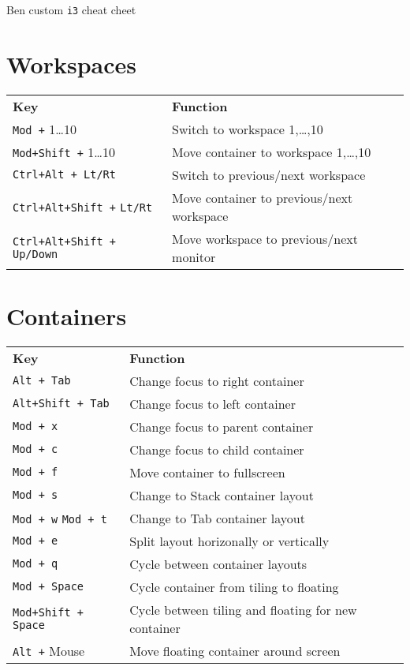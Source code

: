 \documentclass[landscape]{article}
\newcommand{\thead}[1]{{\color{black}\bf#1}}
\newcommand{\blankfirst}{%
  \ifodd\rownum\advance\rownum1\relax\fi}
\begin{document}
\thispagestyle{empty}
\begin{center}
  \Huge Ben custom \texttt{i3} cheat cheet %
\end{center}

\begin{multicols}{3}
  \small
  \section*{Workspaces}
  \blankfirst
  \noindent\begin{tabular}{p{0.9in}p{2in}} %
    \thead{Key} & \thead{Function}\\
    \verb|Mod +| 1\dots10 & Switch to workspace 1,\dots,10\\
    \verb|Mod+Shift +| 1\dots10 & Move container to workspace 1,\dots,10\\
    \verb|Ctrl+Alt + Lt/Rt| & Switch to previous/next workspace\\
    \verb|Ctrl+Alt+Shift +| \verb|Lt/Rt| & Move container to previous/next workspace\\
    \verb|Ctrl+Alt+Shift +| \verb|Up/Down| & Move workspace to previous/next monitor\\
  \end{tabular}

  \section*{Containers}
  \blankfirst
  \noindent\begin{tabular}{p{0.9in}p{2in}} %
    \thead{Key} & \thead{Function}\\
    \verb|Alt + Tab| & Change focus to right container\\
    \verb|Alt+Shift + Tab| & Change focus to left container\\
    \verb|Mod + x| & Change focus to parent container\\
    \verb|Mod + c| & Change focus to child container\\
    \verb|Mod + f| & Move container to fullscreen\\
    \verb|Mod + s| & Change to Stack container layout\\
    \verb|Mod + w| \verb|Mod + t| & Change to Tab container layout\\
    \verb|Mod + e| & Split layout horizonally or vertically\\
    \verb|Mod + q| & Cycle between container layouts\\
    \verb|Mod + Space| & Cycle container from tiling to floating\\
    \verb|Mod+Shift +| \verb|Space| & Cycle between tiling and floating for new container\\
    \verb|Alt +| Mouse & Move floating container around screen\\
  \end{tabular}
  \columnbreak
 

\end{multicols}
\end{document}
